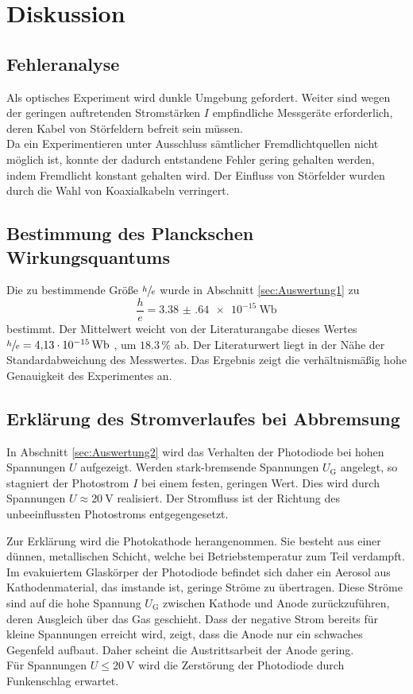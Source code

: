 \section{Diskussion}
\label{sec:Diskussion}
\subsection{Fehleranalyse} %
\label{sub:Diskussion1}
Als optisches Experiment wird dunkle Umgebung gefordert.
Weiter sind wegen der geringen auftretenden Stromstärken $I$ empfindliche Messgeräte erforderlich, deren Kabel von Störfeldern befreit sein müssen.\\
Da ein Experimentieren unter Ausschluss sämtlicher Fremdlichtquellen nicht möglich ist, konnte der dadurch entstandene Fehler gering gehalten werden, indem Fremdlicht konstant gehalten wird.
Der Einfluss von Störfelder wurden durch die Wahl von Koaxialkabeln verringert.
\subsection{Bestimmung des Planckschen Wirkungsquantums} %
\label{sub:Diskussion2}
Die zu bestimmende Größe $\sfrac{h}{e}$ wurde in Abschnitt \ref{sec:Auswertung1} zu 
\begin{equation}
	\frac{h}{e}=\SI{3.38(64)e-15}{\weber}
\end{equation}
bestimmt.
Der Mittelwert weicht von der Literaturangabe dieses Wertes $\sfrac{h}{e}=\SI{4.13e-15}{\weber}$ \cite{texas_instruments1},\cite{texas_instruments2} um $18.3\,\%$ 
ab. Der Literaturwert liegt in der Nähe der Standardabweichung des Messwertes.
Das Ergebnis zeigt die verhältnismäßig hohe Genauigkeit des Experimentes an.
\subsection{Erklärung des Stromverlaufes bei Abbremsung} %
\label{sub:Diskussion3}
In Abschnitt \ref{sec:Auswertung2} wird das Verhalten der Photodiode bei hohen Spannungen $U$ aufgezeigt.
Werden stark-bremsende Spannungen $U_\text{G}$ angelegt, so stagniert der Photostrom $I$ bei einem festen, geringen Wert.
Dies wird durch Spannungen $U\approx\SI{20}{\volt}$ realisiert.
Der Stromfluss ist der Richtung des unbeeinflussten Photostroms entgegengesetzt.

Zur Erklärung wird die Photokathode herangenommen. 
Sie besteht aus einer dünnen, metallischen Schicht, welche bei Betriebstemperatur zum Teil verdampft.
Im evakuiertem Glaskörper der Photodiode befindet sich daher ein Aerosol aus Kathodenmaterial, das imstande ist, 
geringe Ströme zu übertragen. 
Diese Ströme sind auf die hohe Spannung $U_\text{G}$ zwischen Kathode und Anode zurückzuführen, deren Ausgleich über das Gas geschieht.
Dass der negative Strom bereits für kleine Spannungen erreicht wird, zeigt, dass die Anode nur ein schwaches Gegenfeld aufbaut.
Daher scheint die Austrittsarbeit der Anode gering.\\
Für Spannungen $U\le\SI{20}{\volt}$ wird die Zerstörung der Photodiode durch Funkenschlag erwartet.

